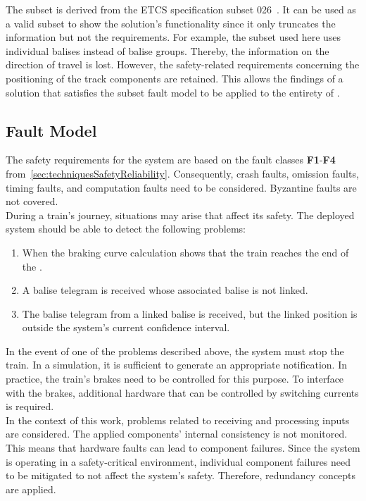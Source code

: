 \noindent
The subset is derived from the ETCS specification subset 026~\cite{ETCS26}.
It can be used as a valid subset to show the solution's functionality since it only truncates the information but not the requirements.
For example, the subset used here uses individual balises instead of balise groups.
Thereby, the information on the direction of travel is lost.
However, the safety-related requirements concerning the positioning of the track components are retained.
This allows the findings of a solution that satisfies the subset fault model to be applied to the entirety of .

\subsection{Fault Model}
\label{subsec:faultModel}
The safety requirements for the system are based on the fault classes \textbf{F1}-\textbf{F4} from~\autoref{sec:techniquesSafetyReliability}\cite{CristianFaultModel}.
Consequently, crash faults, omission faults, timing faults, and computation faults need to be considered.
Byzantine faults are not covered.
\\

\noindent
During a train's journey, situations may arise that affect its safety.
The deployed system should be able to detect the following problems:

\begin{enumerate}
\item When the braking curve calculation shows that the train reaches the end of the .
\item A balise telegram is received whose associated balise is not linked.
\item The balise telegram from a linked balise is received, but the linked position is outside the system's current confidence interval.
\end{enumerate}

\noindent
In the event of one of the problems described above, the system must stop the train.
In a simulation, it is sufficient to generate an appropriate notification.
In practice, the train's brakes need to be controlled for this purpose.
To interface with the brakes, additional hardware that can be controlled by switching currents is required.
\\

\noindent
In the context of this work, problems related to receiving and processing inputs are considered.
The applied components' internal consistency is not monitored.
This means that hardware faults can lead to component failures.
Since the system is operating in a safety-critical environment, individual component failures need to be mitigated to not affect the system's safety.
Therefore, redundancy concepts are applied.

